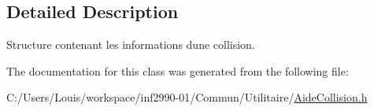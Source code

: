 \subsection{Detailed Description}
Structure contenant les informations d\textquotesingle{}une collision. 

The documentation for this class was generated from the following file\+:\begin{DoxyCompactItemize}
\item 
C\+:/\+Users/\+Louis/workspace/inf2990-\/01/\+Commun/\+Utilitaire/\hyperlink{_aide_collision_8h}{Aide\+Collision.\+h}\end{DoxyCompactItemize}
